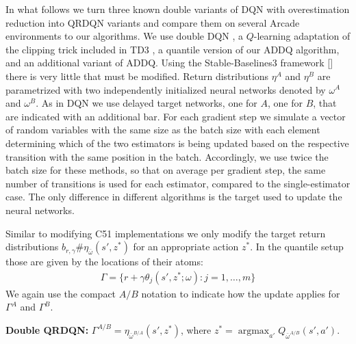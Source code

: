 \documentclass{article}
\theoremstyle{plain}
\theoremstyle{definition}
\theoremstyle{remark}
\begin{document}
In what follows we turn three known double variants of DQN with overestimation reduction into QRDQN variants and compare them on several Arcade environments to our algorithms. We use double DQN \cite{hasselt2015doubledqn}, a $Q$-learning adaptation of the clipping trick included in TD3 \cite{fujimoto2018addressing}, a quantile version of our ADDQ algorithm, and an additional variant of ADDQ. Using the Stable-Baselines3 framework [\cite{sb3}] there is very little that must be modified. Return distributions $\eta^A$ and $\eta^B$ are parametrized  with two independently initialized neural networks denoted by $\omega^A$ and $\omega^B$. As in DQN we use delayed target networks, one for $A$, one for $B$, that are indicated with an additional bar. For each gradient step we simulate a vector of random variables with the same size as the batch size with each element determining which of the two estimators is being updated based on the respective transition with the same position in the batch. Accordingly, we use twice the batch size for these methods, so that on average per gradient step, the same number of transitions is used for each estimator, compared to the single-estimator case. The only difference in different algorithms is the target used to update the neural networks.

Similar to modifying C51 implementations we only modify the target return distributions $b_{r,\gamma}\#\eta_{\bar\omega}(s',z^*)$ for an appropriate action $z^*$. In the quantile setup those are given by the locations of their atoms:
\begin{align*}
    \Gamma=\{r+\gamma\theta_j(s',z^*;\omega):j=1,\dots,m\}    
\end{align*}
We again use the compact $A/B$ notation to indicate how the update applies for $\Gamma^A$ and $\Gamma^B$.


\textbf{Double QRDQN:} $\Gamma^{A/B} = \eta_{\bar\omega^{B/A}}(s',z^*)$, where  $z^*=\operatorname{argmax}_{a'}Q_{\bar\omega^{A/B}}(s',a')$. \smallskip

\end{document}

